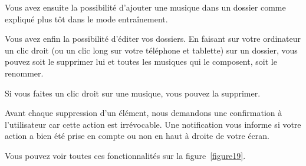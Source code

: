 \documentclass[12pt,french]{article}
\begin{document}
Vous avez ensuite la possibilité d'ajouter une musique dans un dossier comme expliqué plus tôt dans le mode entraînement.

Vous avez enfin la possibilité d'éditer vos dossiers. En faisant sur votre ordinateur un clic droit (ou un clic long sur votre téléphone et tablette) sur un dossier, vous pouvez soit le supprimer lui et toutes les musiques qui le composent, soit le renommer.

Si vous faites un clic droit sur une musique, vous pouvez la supprimer.

Avant chaque suppression d'un élément, nous demandons une confirmation à l'utilisateur car cette action est irrévocable. Une notification vous informe si votre action a bien été prise en compte ou non en haut à droite de votre écran.

Vous pouvez voir toutes ces fonctionnalités sur la figure~\ref{figure19}.
\end{document}
